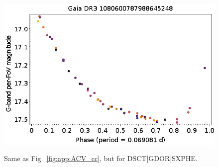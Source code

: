 \documentclass[longauth]{aa}
\begin{document}
\begin{appendix}
\begin{figure}
\hspace{2mm}
 \includegraphics[width=0.45\hsize]{figures/appendix/DSCT-56.png} \\
\vspace{4mm}
 \caption{Same as Fig.~\ref{fig:app:ACV_cc}, but for DSCT|GDOR|SXPHE.}
 \label{fig:app:DSCT_cc}
\end{figure}




\end{appendix}
\end{document}
